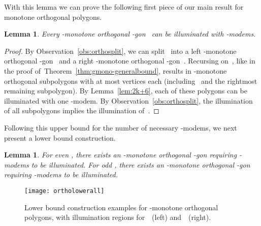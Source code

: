 \documentclass[A4]{article}
\newtheorem{lemma}[theorem]{Lemma}
\begin{document}
With this lemma we can prove the following first piece of our main result for monotone orthogonal polygons.

\begin{lemma}\label{lem:orthoupperall}
  Every -monotone orthogonal -gon~ can be illuminated with  \mbox{-modems}.
\end{lemma}
\begin{proof}
  By Observation~\ref{obs:orthosplit}, we can split~ into a left -monotone orthogonal -gon~ and a right -monotone orthogonal -gon~.
  Recursing on~, like in the proof of~Theorem~\ref{thm:gmono-generalbound}, results in  -monotone orthogonal subpolygons with at most  vertices each (including~ and the rightmost remaining subpolygon).
By Lemma~\ref{lem:2k+6}, each of these polygons can be illuminated with one \mbox{-modem}.
By Observation~\ref{obs:orthosplit}, the illumination of all subpolygons implies the illumination of~. \end{proof}

Following this upper bound for the number of necessary \mbox{-modems}, we next present a lower bound construction.

\begin{lemma}\label{lem:ortholowerall}
  For even , there exists an -monotone orthogonal -gon requiring  \mbox{-modems} to be illuminated.
For odd , there exists an -monotone orthogonal -gon requiring  \mbox{-modems} to be illuminated.
\end{lemma}


\begin{figure}[htb]
  \centering
  \texttt{[image: ortholowerall]}
  \caption{Lower bound construction examples for -monotone orthogonal polygons, with illumination regions for~~(left) and~~(right).
  }
 \label{fig:ortholowerall}
\end{figure}
\end{document}
